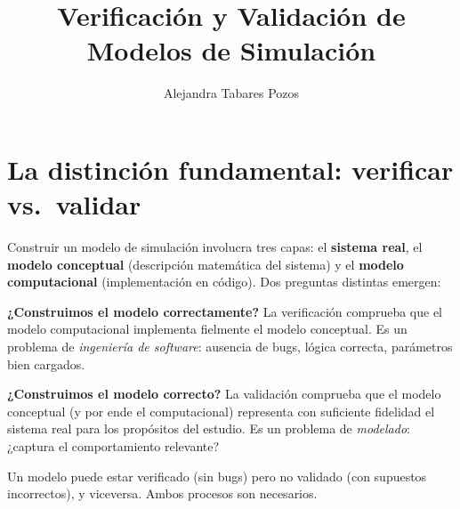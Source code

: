 \documentclass[11pt, letterpaper]{article}
\title{Verificación y Validación de Modelos de Simulación}
\author{Alejandra Tabares Pozos}
\date{}
\begin{document}
\maketitle
\tableofcontents
\newpage

\section{La distinción fundamental: verificar vs.\ validar}

Construir un modelo de simulación involucra tres capas: el \textbf{sistema real}, el \textbf{modelo conceptual} (descripción matemática del sistema) y el \textbf{modelo computacional} (implementación en código). Dos preguntas distintas emergen:

\begin{definicionbox}[Verificación]
\textbf{¿Construimos el modelo correctamente?} La verificación comprueba que el modelo computacional implementa fielmente el modelo conceptual. Es un problema de \emph{ingeniería de software}: ausencia de bugs, lógica correcta, parámetros bien cargados.
\end{definicionbox}

\begin{definicionbox}[Validación]
\textbf{¿Construimos el modelo correcto?} La validación comprueba que el modelo conceptual (y por ende el computacional) representa con suficiente fidelidad el sistema real para los propósitos del estudio. Es un problema de \emph{modelado}: ¿captura el comportamiento relevante?
\end{definicionbox}

Un modelo puede estar verificado (sin bugs) pero no validado (con supuestos incorrectos), y viceversa. Ambos procesos son necesarios.

\begin{center}
\end{center}
\end{document}
